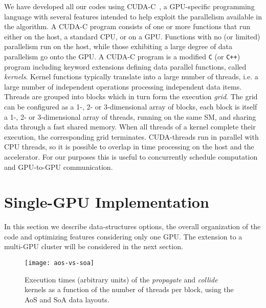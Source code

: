 \documentclass{elsarticle}
\begin{document}

We have developed all our codes using CUDA-C~\cite{cuda}, a GPU-specific 
programming language with several features intended to help exploit the parallelism 
available in the algorithm.
%
A CUDA-C program consists of one or more functions that run either on
the host, a standard CPU, or on a GPU. 
%
Functions with no (or limited) parallelism run on the host, 
while those exhibiting a large degree of data parallelism go onto the GPU. 
%
A CUDA-C program is a modified {\tt C} (or {\tt C++}) program including 
keyword extensions defining data parallel functions, called {\em kernels}.
%
Kernel functions typically translate into a large number of threads, i.e. 
a large number of independent operations processing independent data items. 
%
Threads are grouped into blocks which in turn form the 
execution {\em grid}. 
%
The grid can be configured as a 1-, 2- or 3-dimensional array of blocks, 
each block is itself a 1-, 2- or 3-dimensional array of threads, running 
on the same SM, and sharing data through a fast shared memory.
%
When all threads of a kernel complete their execution, the corresponding 
grid terminates. CUDA-threads run in parallel with 
CPU threads, so it is possible to overlap in time processing on the host and 
the accelerator.
%
For our purposes this is useful to concurrently schedule computation and 
GPU-to-GPU communication.


\section{Single-GPU Implementation}

In this section we describe data-structures options, the overall 
organization of the code and optimizing features considering only 
one GPU. The extension to a multi-GPU cluster will be considered in the 
next section. 

%
\begin{figure}[t]
\centering
\texttt{[image: aos-vs-soa]}
%
\caption{Execution times (arbitrary units) of the {\em propagate} 
and {\em collide} kernels as a function of the number of threads per 
block, using the AoS and SoA data layouts.}
\label{fig:aos-vs-soa}
\end{figure}
%
\end{document}
